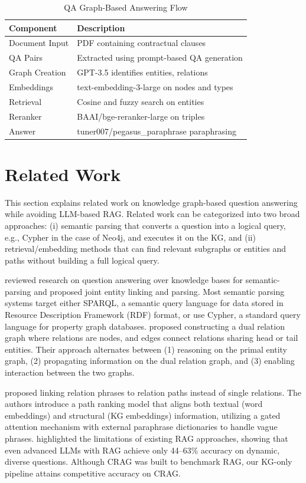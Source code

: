 \begin{table}[htbp!]
\centering
\caption{QA Graph-Based Answering Flow}
\label{table:QAGraph-BasedAnsweringFlow}
\renewcommand{\arraystretch}{1.5}
\begin{tabular}{|p{5cm} | p{7cm}|}
\hline
\textbf{Component} & \textbf{Description} \\
\hline
Document Input & PDF containing contractual clauses \\
QA Pairs & Extracted using prompt-based QA generation \\
Graph Creation & GPT-3.5 identifies entities, relations \\
Embeddings & text-embedding-3-large on nodes and types \\
Retrieval & Cosine and fuzzy search on entities \\
Reranker & BAAI/bge-reranker-large on triples \\
Answer & tuner007/pegasus\_paraphrase paraphrasing \\
\hline
\end{tabular}
\end{table}


\section{Related Work}
This section explains related work on knowledge graph-based question answering while avoiding LLM-based RAG. Related work can be categorized into two broad approaches: (i) semantic parsing that converts a question into a logical query, e.g., Cypher in the case of Neo4j, and executes it on the KG, and (ii) retrieval/embedding methods that can find relevant subgraphs or entities and paths without building a full logical query.

\citet{gu2022knowledge} reviewed research on question answering over knowledge bases for semantic-parsing and proposed joint entity linking and parsing. Most semantic parsing systems target either SPARQL, a semantic query language for data stored in Resource Description Framework (RDF) format, or use Cypher, a standard query language for property graph databases. \citet{du2023relation} proposed constructing a dual relation graph where relations are nodes, and edges connect relations sharing head or tail entities. Their approach alternates between (1) reasoning on the primal entity graph, (2) propagating information on the dual relation graph, and (3) enabling interaction between the two graphs. 

\citet{zhao2022implicit} proposed linking relation phrases to relation paths instead of single relations. The authors introduce a path ranking model that aligns both textual (word embeddings) and structural (KG embeddings) information, utilizing a gated attention mechanism with external paraphrase dictionaries to handle vague phrases. \citet{yang2024crag} highlighted the limitations of existing RAG approaches, showing that even advanced LLMs with RAG achieve only 44–63\% accuracy on dynamic, diverse questions. Although CRAG was built to benchmark RAG, our KG-only pipeline attains competitive accuracy on CRAG.

